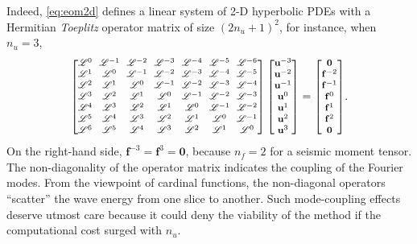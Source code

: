 \documentclass[extra,referee]{gji}
\begin{document}
Indeed, \eqref{eq:eom2d} defines a linear system of 2-D hyperbolic PDEs with 
a Hermitian \textit{Toeplitz} \cite[Chap 4,][]{golub2012matrix}
operator matrix of size $\left(2n_u+1\right)^2$, 
for instance, when $n_u=3$, 
\begin{equation}
  {\footnotesize
  \setlength{\arraycolsep}{3pt}
  \begin{bmatrix}\mathscr{L}^{0} & \mathscr{L}^{-1} & \mathscr{L}^{-2} & \mathscr{L}^{-3} & \mathscr{L}^{-4}& \mathscr{L}^{-5} & \mathscr{L}^{-6}\\
  \mathscr{L}^{1} & \mathscr{L}^{0} & \mathscr{L}^{-1} & \mathscr{L}^{-2} & \mathscr{L}^{-3}& \mathscr{L}^{-4} & \mathscr{L}^{-5}\\
  \mathscr{L}^{2} & \mathscr{L}^{1} & \mathscr{L}^{0} & \mathscr{L}^{-1} & \mathscr{L}^{-2}& \mathscr{L}^{-3} & \mathscr{L}^{-4}\\
  \mathscr{L}^{3} & \mathscr{L}^{2} & \mathscr{L}^{1} & \mathscr{L}^{0} & \mathscr{L}^{-1}& \mathscr{L}^{-2} & \mathscr{L}^{-3}\\
  \mathscr{L}^{4} & \mathscr{L}^{3} & \mathscr{L}^{2} & \mathscr{L}^{1} & \mathscr{L}^{0}& \mathscr{L}^{-1} & \mathscr{L}^{-2}\\
  \mathscr{L}^{5} & \mathscr{L}^{4} & \mathscr{L}^{3} & \mathscr{L}^{2} & \mathscr{L}^{1}& \mathscr{L}^{0} & \mathscr{L}^{-1}\\
  \mathscr{L}^{6} & \mathscr{L}^{5} & \mathscr{L}^{4} & \mathscr{L}^{3} & \mathscr{L}^{2}& \mathscr{L}^{1} & \mathscr{L}^{0}
  \end{bmatrix}\begin{bmatrix}
  \mathbf{u}^{-3}\\
  \mathbf{u}^{-2}\\
  \mathbf{u}^{-1}\\
  \mathbf{u}^{0}\\
  \mathbf{u}^{1}\\
  \mathbf{u}^{2}\\
  \mathbf{u}^{3}
  \end{bmatrix}=\begin{bmatrix}
  \mathbf{0}\\
  \mathbf{f}^{-2}\\
  \mathbf{f}^{-1}\\
  \mathbf{f}^{0}\\
  \mathbf{f}^{1}\\
  \mathbf{f}^{2}\\
  \mathbf{0}
  \end{bmatrix}}.
  \label{eq:full5}
\end{equation}
On the right-hand side, $\mathbf{f}^{-3}=\mathbf{f}^{3}=\mathbf{0}$,
because $n_f=2$ for a seismic moment tensor.
The non-diagonality of the operator matrix indicates the coupling of 
the Fourier modes. From the viewpoint of cardinal functions, the non-diagonal
operators ``scatter'' the wave energy from one slice to another.  
Such mode-coupling effects deserve utmost
care because it could deny the viability of the method if the 
computational cost surged with $n_u$.
\end{document}
